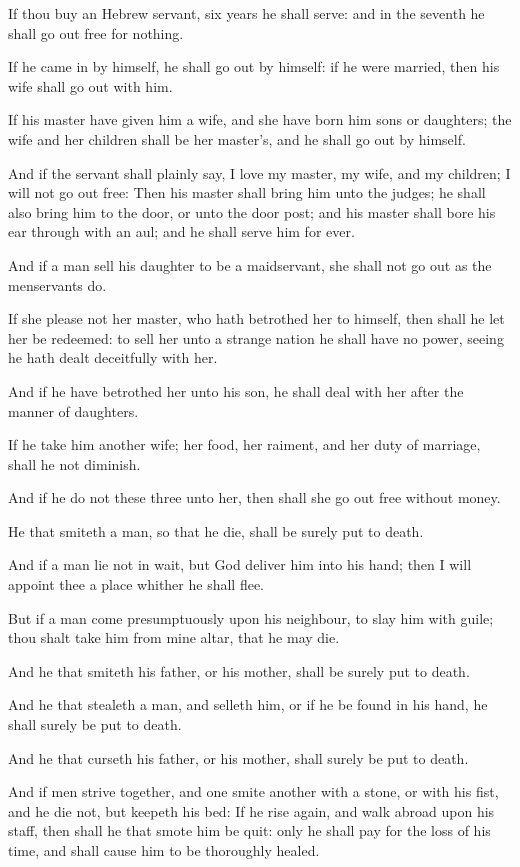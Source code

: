 \verse If thou buy an Hebrew servant, six years he shall serve: and in
the seventh he shall go out free for nothing.

\verse If he came in by himself, he shall go out by himself: if he were
married, then his wife shall go out with him.

\verse If his master have given him a wife, and she have born him sons
or daughters; the wife and her children shall be her master's, and he
shall go out by himself.

\verse And if the servant shall plainly say, I love my master, my wife,
and my children; I will not go out free: \verse Then his master shall
bring him unto the judges; he shall also bring him to the door, or
unto the door post; and his master shall bore his ear through with an
aul; and he shall serve him for ever.

\verse And if a man sell his daughter to be a maidservant, she shall not
go out as the menservants do.

\verse If she please not her master, who hath betrothed her to himself,
then shall he let her be redeemed: to sell her unto a strange nation
he shall have no power, seeing he hath dealt deceitfully with her.

\verse And if he have betrothed her unto his son, he shall deal with her
after the manner of daughters.

\verse If he take him another wife; her food, her raiment, and her duty
of marriage, shall he not diminish.

\verse And if he do not these three unto her, then shall she go out
free without money.

\verse He that smiteth a man, so that he die, shall be surely put to
death.

\verse And if a man lie not in wait, but God deliver him into his hand;
then I will appoint thee a place whither he shall flee.

\verse But if a man come presumptuously upon his neighbour, to slay him
with guile; thou shalt take him from mine altar, that he may die.

\verse And he that smiteth his father, or his mother, shall be surely
put to death.

\verse And he that stealeth a man, and selleth him, or if he be found
in his hand, he shall surely be put to death.

\verse And he that curseth his father, or his mother, shall surely be
put to death.

\verse And if men strive together, and one smite another with a stone,
or with his fist, and he die not, but keepeth his bed: \verse If he
rise again, and walk abroad upon his staff, then shall he that smote
him be quit: only he shall pay for the loss of his time, and shall
cause him to be thoroughly healed.

